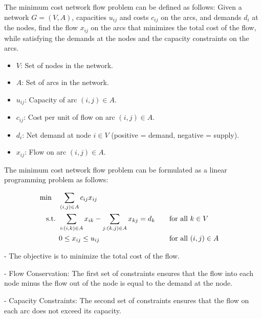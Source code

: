The minimum cost network flow problem can be defined as follows: Given a network \( G = (V, A) \), capacities \( u_{ij} \) and costs \( c_{ij} \) on the arcs, and demands \( d_i \) at the nodes, find the flow \( x_{ij} \) on the arcs that minimizes the total cost of the flow, while satisfying the demands at the nodes and the capacity constraints on the arcs.

\begin{itemize}
\item \( V \): Set of nodes in the network.
\item \( A \): Set of arcs in the network.
\end{itemize}

\begin{itemize}
\item \( u_{ij} \): Capacity of arc \( (i, j) \in A \).
\item \( c_{ij} \): Cost per unit of flow on arc \( (i, j) \in A \).
\item \( d_i \): Net demand at node \( i \in V \) (positive = demand, negative = supply).
\end{itemize}

\begin{itemize}
\item \( x_{ij} \): Flow on arc \( (i, j) \in A \).
\end{itemize}

The minimum cost network flow problem can be formulated as a linear programming problem as follows:

\begin{align*}
\min \quad & \sum_{(i, j) \in A} c_{ij} x_{ij} \\
\text{ s.t. }        & \sum_{i:(i, k) \in A} x_{ik} - \sum_{j:(k, j) \in A} x_{kj} = d_k &&\quad \text{for all } k \in V \\
& 0 \leq x_{ij} \leq u_{ij} &&\quad \text{for all } (i, j) \in A
\end{align*}

- The objective is to minimize the total cost of the flow.

- Flow Conservation: The first set of constraints ensures that the flow into each node minus the flow out of the node is equal to the demand at the node.

- Capacity Constraints: The second set of constraints ensures that the flow on each arc does not exceed its capacity.

